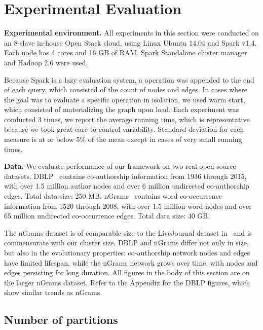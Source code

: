 \section{Experimental Evaluation}
\label{sec:exp}

{\bf Experimental environment.} All experiments in this section were
conducted on an 8-slave in-house Open Stack cloud, using Linux Ubuntu
14.04 and Spark v1.4.  Each node has 4 cores and 16 GB of RAM.  Spark
Standalone cluster manager and Hadoop 2.6 were used.

Because Spark is a lazy evaluation system, a 
operation was appended to the end of each query, which consisted of
the count of nodes and edges.  In cases where the goal was to evaluate
a specific operation in isolation, we used warm start, which consisted
of materializing the graph upon load.  Each experiment was conducted 3
times, we report the average running time, which is representative
because we took great care to control variability.  Standard deviation
for each measure is at or below 5\% of the mean except in cases of
very small running times.

{\bf Data.}  We evaluate performance of our framework on two real
open-source datasets.  DBLP~\cite{dblp} contains co-authorship
information from 1936 through 2015, with over 1.5 million author nodes
and over 6 million undirected co-authorship edges.  Total data size:
250 MB.  nGrams~\cite{nGrams} contains word co-occurrence information
from 1520 through 2008, with over 1.5 million word nodes and over 65
million undirected co-occurrence edges.  Total data size: 40 GB.

The nGrams dataset is of comparable size to the LiveJournal dataset
in~\cite{Xin2013} and is commensurate with our cluster size.  DBLP and
nGrams differ not only in size, but also in the evolutionary
properties: co-authorship network nodes and edges have limited
lifespan, while the nGrams network grows over time, with nodes and
edges persisting for long duration.  All figures in the body of this
section are on the larger nGrams dataset.  Refer to the Appendix for
the DBLP figures, which show similar trends as nGrams.

\subsection{Number of partitions}

